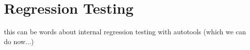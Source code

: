 %
%
\section{Regression Testing}
\label{sec:regress}

this can be words about internal regression testing with autotools
(which we can do now...)

%
%
